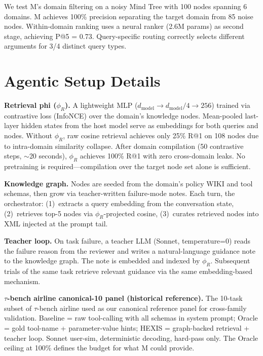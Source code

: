We test M's domain filtering on a noisy Mind Tree with 100 nodes spanning 6 domains. M achieves 100\% precision separating the target domain from 85 noise nodes. Within-domain ranking uses a neural ranker (2.6M params) as second stage, achieving P@5 = 0.73. Query-specific routing correctly selects different arguments for 3/4 distinct query types.

\section{Agentic Setup Details}
\label{sec:agentic_details}

\textbf{Retrieval phi ($\phi_R$).} A lightweight MLP ($d_\text{model} \to d_\text{model}/4 \to 256$) trained via contrastive loss (InfoNCE) over the domain's knowledge nodes. Mean-pooled last-layer hidden states from the host model serve as embeddings for both queries and nodes. Without $\phi_R$, raw cosine retrieval achieves only 25\% R@1 on 108 nodes due to intra-domain similarity collapse. After domain compilation (50 contrastive steps, $\sim$20 seconds), $\phi_R$ achieves 100\% R@1 with zero cross-domain leaks. No pretraining is required---compilation over the target node set alone is sufficient.

\textbf{Knowledge graph.} Nodes are seeded from the domain's policy WIKI and tool schemas, then grow via teacher-written failure-mode notes. Each turn, the orchestrator: (1)~extracts a query embedding from the conversation state, (2)~retrieves top-5 nodes via $\phi_R$-projected cosine, (3)~curates retrieved nodes into XML injected at the prompt tail.

\textbf{Teacher loop.} On task failure, a teacher LLM (Sonnet, temperature=0) reads the failure reason from the reviewer and writes a natural-language guidance note to the knowledge graph. The note is embedded and indexed by $\phi_R$. Subsequent trials of the same task retrieve relevant guidance via the same embedding-based mechanism.

\textbf{$\tau$-bench airline canonical-10 panel (historical reference).} The 10-task subset of $\tau$-bench airline used as our canonical reference panel for cross-family validation. Baseline = raw tool-calling with all schemas in system prompt; Oracle = gold tool-name + parameter-value hints; HEXIS = graph-backed retrieval + teacher loop. Sonnet user-sim, deterministic decoding, hard-pass only. The Oracle ceiling at 100\% defines the budget for what M could provide.

